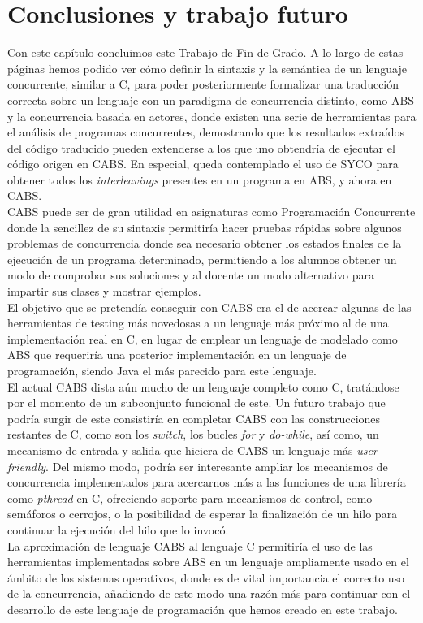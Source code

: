 \chapter{Conclusiones y trabajo futuro}

Con este capítulo concluimos este Trabajo de Fin de Grado. A lo largo de estas páginas hemos podido ver cómo definir la sintaxis y la semántica de un lenguaje concurrente, similar a C, para poder posteriormente formalizar una traducción correcta sobre un lenguaje con un paradigma de concurrencia distinto, como ABS y la concurrencia basada en actores, donde existen una serie de herramientas para el análisis de programas concurrentes, demostrando que los resultados extraídos del código traducido pueden extenderse a los que uno obtendría de ejecutar el código origen en CABS. En especial, queda contemplado el uso de SYCO para obtener todos los \emph{interleavings} presentes en un programa en ABS, y ahora en CABS.\\

CABS puede ser de gran utilidad en asignaturas como Programación Concurrente donde la sencillez de su sintaxis permitiría hacer pruebas rápidas sobre algunos problemas de concurrencia donde sea necesario obtener los estados finales de la ejecución de un programa determinado, permitiendo a los alumnos obtener un modo de comprobar sus soluciones y al docente un modo alternativo para impartir sus clases y mostrar ejemplos.\\

El objetivo que se pretendía conseguir con CABS era el de acercar algunas de las herramientas de testing más novedosas a un lenguaje más próximo al de una implementación real en C, en lugar de emplear un lenguaje de modelado como ABS que requeriría una posterior implementación en un lenguaje de programación, siendo Java el más parecido para este lenguaje.\\

El actual CABS dista aún mucho de un lenguaje completo como C, tratándose por el momento de un subconjunto funcional de este. Un futuro trabajo que podría surgir de este consistiría en completar CABS con las construcciones restantes de C, como son los \emph{switch}, los bucles \emph{for} y \emph{do-while}, así como, un mecanismo de entrada y salida que hiciera de CABS un lenguaje más \emph{user friendly}. Del mismo modo, podría ser interesante ampliar los mecanismos de concurrencia implementados para acercarnos más a las funciones de una librería como \emph{pthread} en C, ofreciendo soporte para mecanismos de control, como semáforos o cerrojos, o la posibilidad de esperar la finalización de un hilo para continuar la ejecución del hilo que lo invocó.\\

La aproximación de lenguaje CABS al lenguaje C permitiría el uso de las herramientas implementadas sobre ABS en un lenguaje ampliamente usado en el ámbito de los sistemas operativos, donde es de vital importancia el correcto uso de la concurrencia, añadiendo de este modo una razón más para continuar con el desarrollo de este lenguaje de programación que hemos creado en este trabajo.
